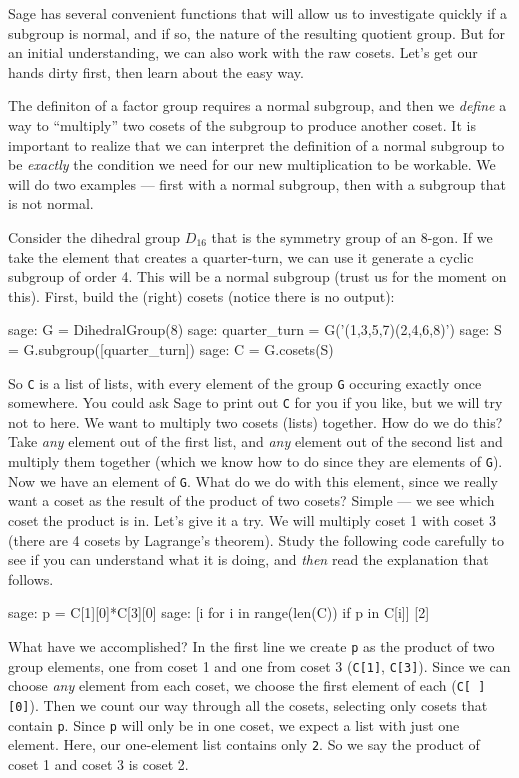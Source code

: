 Sage has several convenient functions that will allow us to investigate quickly if a subgroup is normal, and if so, the nature of the resulting quotient group.  But for an initial understanding, we can also work with the raw cosets.  Let's get our hands dirty first, then learn about the easy way.\par
%
%
The definiton of a factor group requires a normal subgroup, and then we \emph{define} a way to ``multiply'' two cosets of the subgroup to produce another coset.  It is important to realize that we can interpret the definition of a normal subgroup to be \emph{exactly} the condition we need for our new multiplication to be workable.  We will do two examples --- first with a normal subgroup, then with a subgroup that is not normal.\par
%
Consider the dihedral group $D_{16}$ that is the symmetry group of an $8$-gon.  If we take the element that creates a quarter-turn, we can use it generate a cyclic subgroup of order 4.  This will be a normal subgroup (trust us for the moment on this).  First, build the (right) cosets (notice there is no output):
%
\begin{sageexample}
sage: G = DihedralGroup(8)
sage: quarter_turn = G('(1,3,5,7)(2,4,6,8)')
sage: S = G.subgroup([quarter_turn])
sage: C = G.cosets(S)
\end{sageexample}
%
So \verb?C? is a list of lists, with every element of the group \verb?G? occuring exactly once somewhere.  You could ask Sage to print out \verb?C? for you if you like, but we will try not to here.  We want to multiply two cosets (lists) together.  How do we do this?  Take \emph{any} element out of the first list, and \emph{any} element out of the second list and multiply them together (which we know how to do since they are elements of \verb?G?).  Now we have an element of \verb?G?.  What do we do with this element, since we really want a coset as the result of the product of two cosets?  Simple --- we see which coset the product is in.  Let's give it a try.  We will multiply coset 1 with coset 3 (there are 4 cosets by Lagrange's theorem).  Study the following code carefully to see if you can understand what it is doing, and \emph{then} read the explanation that follows.
%
\begin{sageexample}
sage: p = C[1][0]*C[3][0]
sage: [i for i in range(len(C)) if p in C[i]]
[2]
\end{sageexample}
%
What have we accomplished?  In the first line we create \verb?p? as the product of two group elements, one from coset 1 and one from coset 3 (\verb?C[1]?, \verb?C[3]?).  Since we can choose \emph{any} element from each coset, we choose the first element of each (\verb?C[ ][0]?).  Then we count our way through all the cosets, selecting only cosets that contain \verb?p?.  Since \verb?p? will only be in one coset, we expect a list with just one element.  Here, our one-element list contains only \verb?2?.  So we say the product of coset 1 and coset 3 is coset 2.\par
